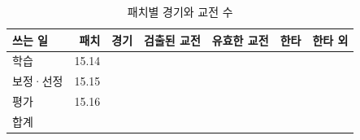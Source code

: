 \begin{table}[!t]
  \centering
  \caption{패치별 경기와 교전 수}
  \label{tab:corpus-census}
  \footnotesize
  \begin{tabular}{@{}lrrrrrr@{}}
    \toprule
    쓰는 일 & 패치 & 경기 & 검출된 교전 & 유효한 교전 & 한타 & 한타 외 \\
    \midrule
    학습 & 15.14 & \numMatchesTrain{} & \numEngTrainDet{} & \numEngTrainValid{} & \numTTrain{} & \numNTrain{} \\
    보정·선정 & 15.15 & \numMatchesVal{} & \numEngValDet{} & \numEngValValid{} & \numTVal{} & \numNVal{} \\
    평가 & 15.16 & \numMatchesTest{} & \numEngTestDet{} & \numEngTestValid{} & \numTTest{} & \numNTest{} \\
    \midrule
    합계 & & \numMatchesTotal{} & \numEngDetected{} & \numEngValid{} & \numTPooled{} & \numNPooled{} \\
    \bottomrule
  \end{tabular}
\end{table}

